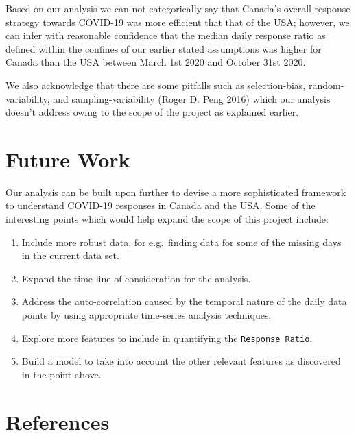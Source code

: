 \documentclass[
]{article}
\providecommand{\tightlist}{%
  \setlength{\itemsep}{0pt}\setlength{\parskip}{0pt}}
\begin{document}
Based on our analysis we can-not categorically say that Canada's overall
response strategy towards COVID-19 was more efficient that that of the
USA; however, we can infer with reasonable confidence that the median
daily response ratio as defined within the confines of our earlier
stated assumptions was higher for Canada than the USA between March 1st
2020 and October 31st 2020.

We also acknowledge that there are some pitfalls such as selection-bias,
random-variability, and sampling-variability (Roger D. Peng 2016) which
our analysis doesn't address owing to the scope of the project as
explained earlier.

\hypertarget{future-work}{%
\section{Future Work}\label{future-work}}

Our analysis can be built upon further to devise a more sophisticated
framework to understand COVID-19 responses in Canada and the USA. Some
of the interesting points which would help expand the scope of this
project include:

\begin{enumerate}
\def\labelenumi{\arabic{enumi}.}
\tightlist
\item
  Include more robust data, for e.g.~finding data for some of the
  missing days in the current data set.
\item
  Expand the time-line of consideration for the analysis.
\item
  Address the auto-correlation caused by the temporal nature of the
  daily data points by using appropriate time-series analysis
  techniques.
\item
  Explore more features to include in quantifying the
  \texttt{Response\ Ratio}.
\item
  Build a model to take into account the other relevant features as
  discovered in the point above.
\end{enumerate}

\hypertarget{references}{%
\section*{References}\label{references}}
\end{document}
